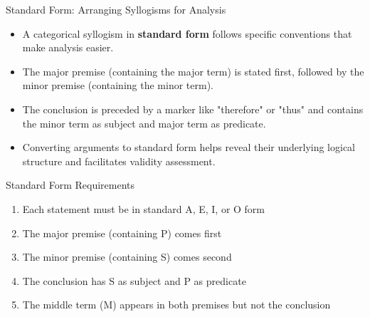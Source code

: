 \documentclass{beamer}
\begin{document}
	\begin{frame}{Standard Form: Arranging Syllogisms for Analysis}
		\begin{itemize}
			\item A categorical syllogism in \textbf{standard form} follows specific conventions that make analysis easier.
			\item The major premise (containing the major term) is stated first, followed by the minor premise (containing the minor term).
			\item The conclusion is preceded by a marker like "therefore" or "thus" and contains the minor term as subject and major term as predicate.
			\item Converting arguments to standard form helps reveal their underlying logical structure and facilitates validity assessment.
		\end{itemize}
		
		\begin{block}{Standard Form Requirements}
			\begin{enumerate}
				\item Each statement must be in standard A, E, I, or O form
				\item The major premise (containing P) comes first
				\item The minor premise (containing S) comes second
				\item The conclusion has S as subject and P as predicate
				\item The middle term (M) appears in both premises but not the conclusion
			\end{enumerate}
		\end{block}
	\end{frame}
	
\end{document}
